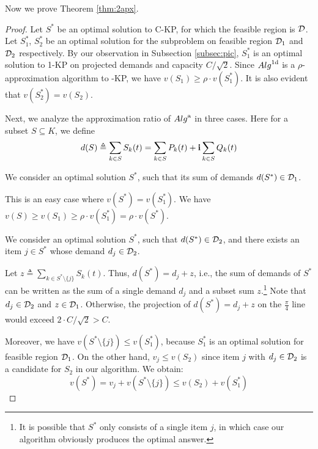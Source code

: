 \iffalse
Now we prove Theorem \ref{thm:2apx}.
\begin{proof}
Let $S^*$ be an optimal solution to C-KP, for which the feasible region is $\cal D$.  Let $S_1^*$, $S_2^*$ be an optimal solution for the subproblem on feasible region ${\cal D}_1$ and ${\cal D}_2$ respectively.  By our observation in Subsection \ref{subsec:pic}, $S_1^*$ is an optimal solution to 1-KP on projected demands and capacity $C/\sqrt{2}$.  Since ${\sc Alg}^{\rm 1d}$ is a $\rho$-approximation algorithm to {-KP}, we have $v(S_1)\geq \rho \cdot v(S_1^*)$.  It is also evident that $v(S_2^*)=v(S_2)$.

Next, we analyze the approximation ratio of ${\sc Alg}^{\rm a}$ in three cases.  Here for a subset $S \subseteq K$, we define 
\begin{equation*}
d(S) \triangleq \sum_{k\in S} S_k(t)=\sum_{k\in S} P_k(t)+ {\bf i}\sum_{k\in S} Q_k(t) 
\end{equation*}

 We consider an optimal solution $S^\ast$, such that its sum of demands $d({S^\ast})\in {\cal D}_1$.  

This is an easy case where $v({S^\ast})=v({S_1^\ast})$.  We have $v(S) \ge v(S_1)\ge  \rho \cdot v({S_1^\ast})=\rho \cdot v({S^\ast})$.
\vskip 5pt

 We consider an optimal solution $S^\ast$, such that $d({S^\ast})\in {\cal D}_2$, and there exists an item $j\in S^\ast$ whose demand $d_j\in {\cal D}_2$.  

Let $z \triangleq \sum_{k\in S^\ast\setminus\{j\}} S_k(t)$. Thus, $d({S^\ast})=d_j+z$, i.e., the sum of demands of $S^\ast$ can be written as the sum of a single demand $d_j$ and a subset sum $z$.\footnote{It is possible that $S^{\ast}$ only consists of a single item $j$, in which case our algorithm obviously produces the optimal answer.}  Note that $d_j\in {\cal D}_2$ and $z\in {\cal D}_1$. Otherwise, the projection of $d({S^\ast})=d_j+z$ on the $\frac{\pi}{4}$ line would exceed $2\cdot C/\sqrt{2}>C$.  

Moreover, we have $v({S^\ast\setminus\{j\}}) \le  v({S_1^\ast})$, because $S_1^\ast$ is an optimal solution for feasible region ${\cal D}_1$.  On the other hand, $v_j \le v({S_2})$ since item $j$ with $d_j\in {\cal D}_2$ is a candidate for $S_2$ in our algorithm.  
We obtain:
\begin{equation*}
v({S^\ast})=v_j+v({S^\ast\setminus\{j\}}) \le  v({S_2})+v({S_1^\ast})
\end{equation*}


\end{proof}
